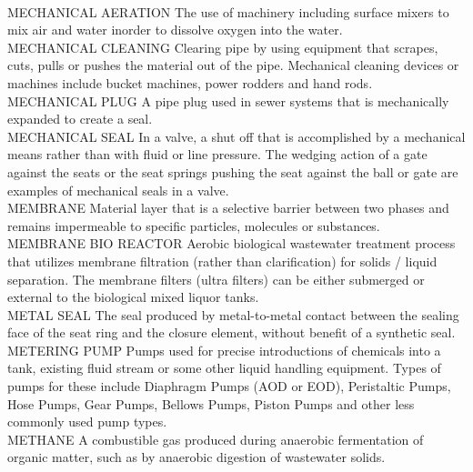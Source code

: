 \vspace{0.3cm}\\
MECHANICAL AERATION
The use of machinery including surface mixers to mix air and water inorder to dissolve oxygen into the water.
\vspace{0.3cm}\\
MECHANICAL CLEANING
Clearing pipe by using equipment that scrapes, cuts, pulls or pushes the material out of the pipe. Mechanical cleaning devices or machines include bucket machines, power rodders and hand rods. 
\vspace{0.3cm}\\
MECHANICAL PLUG
A pipe plug used in sewer systems that is mechanically expanded to create a seal. 
\vspace{0.3cm}\\
MECHANICAL SEAL
In a valve, a shut off that is accomplished by a mechanical means rather than with fluid or line pressure. The wedging action of a gate against the seats or the seat springs pushing the seat against the ball or gate are examples of mechanical seals in a valve.
\vspace{0.3cm}\\
MEMBRANE
Material layer that is a selective barrier between two phases and remains impermeable to specific particles, molecules or substances.
\vspace{0.3cm}\\
MEMBRANE BIO REACTOR
Aerobic biological wastewater treatment process that utilizes membrane filtration (rather than clarification) for solids / liquid separation. The membrane filters (ultra filters) can be either submerged or external to the biological mixed liquor tanks.
\vspace{0.3cm}\\
METAL SEAL
The seal produced by metal-to-metal contact between the sealing face of the seat ring and the closure element, without benefit of a synthetic seal.
\vspace{0.3cm}\\
METERING PUMP
Pumps used for precise introductions of chemicals into a tank, existing fluid stream or some other liquid handling equipment. Types of pumps for these include Diaphragm Pumps (AOD or EOD), Peristaltic Pumps, Hose Pumps, Gear Pumps, Bellows Pumps, Piston Pumps and other less commonly used pump types.
\vspace{0.3cm}\\
METHANE
A combustible gas produced during anaerobic fermentation of organic matter, such as by anaerobic digestion of wastewater solids.
